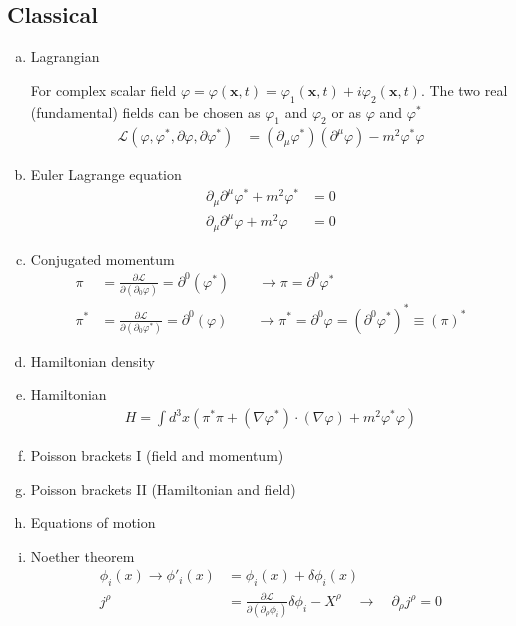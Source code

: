 \documentclass[10pt,a4paper]{report}
\theoremstyle{definition}
\begin{document}
\subsection{Classical}
\begin{enumerate}[a)]
\item Lagrangian 

For complex scalar field $\varphi=\varphi(\mathbf{x},t)=\varphi_1(\mathbf{x},t)+i\varphi_2(\mathbf{x},t)$. The two real (fundamental) fields can be chosen as $\varphi_1$ and $\varphi_2$ or as $\varphi$ and $\varphi^*$
\begin{align}
\mathcal{L}(\varphi,\varphi^*,\partial\varphi,\partial\varphi^*)
&=(\partial_\mu\varphi^*)(\partial^\mu\varphi)-m^2\varphi^*\varphi
\end{align}

\item Euler Lagrange equation
\begin{align}
\partial_\mu\partial^\mu\varphi^*+m^2\varphi^*&=0\\
\partial_\mu\partial^\mu\varphi+m^2\varphi&=0
\end{align}
\item Conjugated momentum
\begin{align}
\pi&=\frac{\partial\mathcal{L}}{\partial(\partial_0\varphi)}=\partial^0(\varphi^*)\qquad\rightarrow \pi=\partial^0{\varphi^*}\\
\pi^*&=\frac{\partial\mathcal{L}}{\partial(\partial_0\varphi^*)}=\partial^0(\varphi)\qquad\rightarrow \pi^*=\partial^0{\varphi}=(\partial^0{\varphi^*})^*\equiv(\pi)^*
\end{align}
\item Hamiltonian density
\item Hamiltonian
\begin{align}
H=\int d^3x\left(\pi^*\pi+(\nabla\varphi^*)\cdot(\nabla\varphi)+m^2\varphi^*\varphi\right)
\end{align}
\item Poisson brackets I (field and momentum)
\item Poisson brackets II (Hamiltonian and field)
\item Equations of motion
\item Noether theorem 
\begin{align}
\phi_i(x)\rightarrow\phi'_i(x)
&=\phi_i(x)+\delta\phi_i(x)\\
j^\rho
&=\frac{\partial\mathcal{L}}{\partial(\partial_\rho\phi_i)}\delta\phi_i-X^\rho
\quad\rightarrow\quad
\partial_\rho j^\rho=0\\

\end{align}
\end{enumerate}
\end{document}
